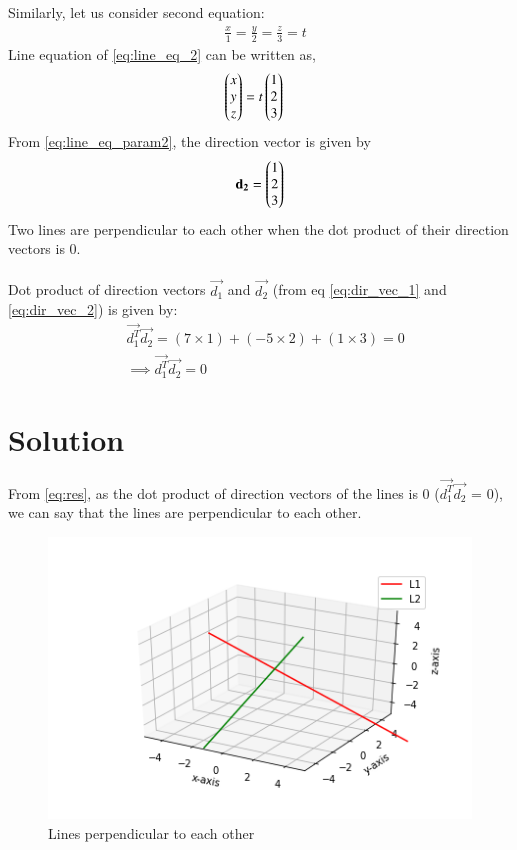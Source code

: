 \documentclass[journal,12pt,twocolumn]{IEEEtran}
\begin{document}
Similarly, let us consider second equation:
 \begin{align} \label{eq:line_eq_2}
& \frac{x}{1} = \frac{y}{2} = \frac{z}{3} = t
\end{align}
Line equation of  \ref{eq:line_eq_2} can be written as,
 \begin{align} \label{eq:line_eq_param2}
& \begin{pmatrix}x\\ y\\ z\end{pmatrix} = t \begin{pmatrix}1\\ 2\\ 3\end{pmatrix}
\end{align}
From  \ref{eq:line_eq_param2},  the direction vector is given by 
 \begin{align} \label{eq:dir_vec_2}
\mathbf{d_2} = \begin{pmatrix}1\\ 2\\ 3\end{pmatrix}
 \end{align}
Two lines are perpendicular to each other when the dot product of their direction vectors is 0.\\
\\
Dot product of direction vectors $\vec{d_1}$ and $\vec{d_2}$ (from eq \ref{eq:dir_vec_1} and \ref{eq:dir_vec_2}) is given by:\\
 \begin{align}
& \vec{d_1^T}\vec{d_2}= (7 \times 1) + (-5 \times 2) + (1 \times 3) = 0\\
& \implies \boxed{\vec{d_1^T}\vec{d_2} = 0}  \label{eq:res}
\end{align}


\section{Solution}

From \ref{eq:res}, as the dot product of direction vectors of the lines is 0 ($\vec{d_1^T}\vec{d_2}$ = 0), we can say that the lines are perpendicular to each other.

\renewcommand{\thefigure}{\arabic{figure}}
\begin{figure}[h!]
	\centering
	\includegraphics[width=\columnwidth]{lines.png}
	\caption{Lines perpendicular to each other}
	\label{myfig}
\end{figure}\\
\\
\end{document}
